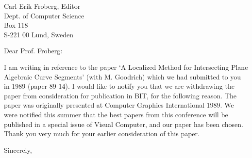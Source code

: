 \signature{John K. Johnstone\\jj@cs.jhu.edu}

\begin{letter}
{Carl-Erik Froberg, Editor\\
Dept. of Computer Science\\
Box 118\\
S-221 00 Lund, Sweden
}

\opening{Dear Prof. Froberg:}

I am writing in reference to the paper
`A Localized Method for Intersecting Plane Algebraic Curve Segments' 
(with M. Goodrich) which we had submitted to you in 1989 (paper 89-14).
I would like to notify you that we are withdrawing the paper
from consideration for publication in BIT, for the following reason.
The paper was originally presented at Computer Graphics International
1989.
We were notified this summer that the best papers from this conference
will be published in a special issue of Visual Computer, and our paper
has been chosen.
Thank you very much for your earlier consideration of this paper.

\closing{Sincerely,}
\end{letter}



